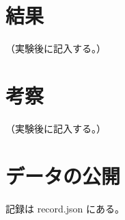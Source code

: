 \documentclass{article}
\providecommand{\airasrecordlink}[1]{#1}
\begin{document}

\section{結果}
\label{sec:results}
（実験後に記入する。）

\section{考察}
\label{sec:discussion}
（実験後に記入する。）

\section*{データの公開}
記録は \airasrecordlink{record.json} にある。



\end{document}
